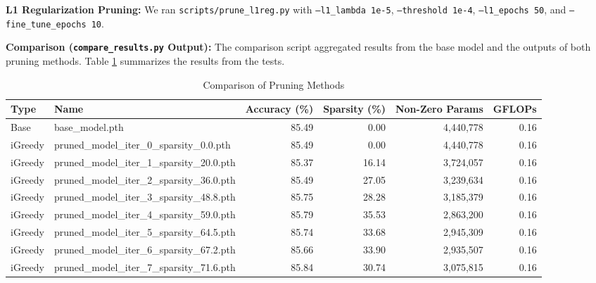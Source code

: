 \documentclass[conference]{IEEEtran} %
\begin{document}
\textbf{L1 Regularization Pruning:} We ran \texttt{scripts/prune\_l1reg.py} with \texttt{--l1\_lambda 1e-5}, \texttt{--threshold 1e-4}, \texttt{--l1\_epochs 50}, and \texttt{--fine\_tune\_epochs 10}.

\textbf{Comparison (\texttt{compare\_results.py} Output):} The comparison script aggregated results from the base model and the outputs of both pruning methods. Table \ref{tab:results} summarizes the results from the tests.

\begin{table}[!t] %
    \renewcommand{\arraystretch}{1.3} %
    \caption{Comparison of Pruning Methods}
    \label{tab:results}
    \centering
    \begin{tabular}{@{}llrrrr@{}}
        \toprule
        Type    & Name                                          & Accuracy (\%) & Sparsity (\%) & Non-Zero Params   & GFLOPs \\ %
        \midrule
        Base    & base\_model.pth                               & 85.49         & 0.00          & 4,440,778         & 0.16   \\
        \midrule
        iGreedy & pruned\_model\_iter\_0\_sparsity\_0.0.pth     & 85.49         & 0.00          & 4,440,778         & 0.16   \\
        iGreedy & pruned\_model\_iter\_1\_sparsity\_20.0.pth    & 85.37         & 16.14         & 3,724,057         & 0.16   \\
        iGreedy & pruned\_model\_iter\_2\_sparsity\_36.0.pth    & 85.49         & 27.05         & 3,239,634         & 0.16   \\
        iGreedy & pruned\_model\_iter\_3\_sparsity\_48.8.pth    & 85.75         & 28.28         & 3,185,379         & 0.16   \\
        iGreedy & pruned\_model\_iter\_4\_sparsity\_59.0.pth    & 85.79         & 35.53         & 2,863,200         & 0.16   \\
        iGreedy & pruned\_model\_iter\_5\_sparsity\_64.5.pth    & 85.74         & 33.68         & 2,945,309         & 0.16   \\
        iGreedy & pruned\_model\_iter\_6\_sparsity\_67.2.pth    & 85.66         & 33.90         & 2,935,507         & 0.16   \\
        iGreedy & pruned\_model\_iter\_7\_sparsity\_71.6.pth    & 85.84         & 30.74         & 3,075,815         & 0.16   \\

\end{tabular}
\end{table}
\end{document}
